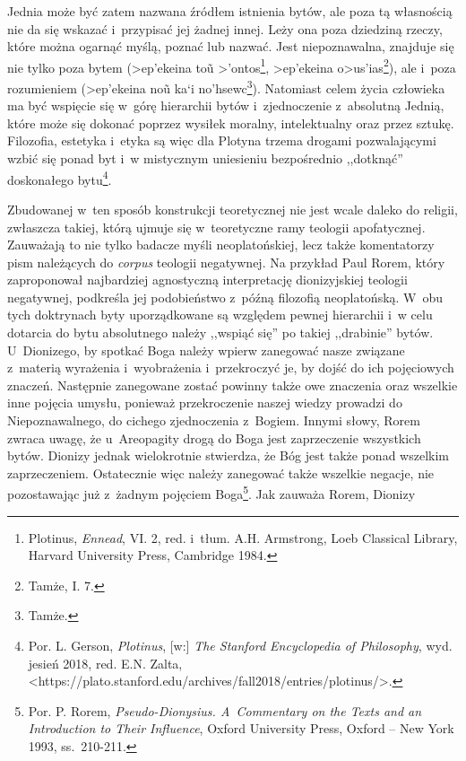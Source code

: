 Jednia może być zatem nazwana źródłem istnienia bytów, ale poza tą własnością nie da się wskazać i~przypisać jej żadnej innej. Leży ona poza dziedziną rzeczy, które można ogarnąć myślą, poznać lub nazwać. Jest niepoznawalna, znajduje się nie tylko poza bytem  (\textgreek{>ep'ekeina to\~u >'ontos}\footnote{Plotinus, \textit{Ennead}, VI. 2, red. i~tłum. A.H. Armstrong, Loeb Classical Library, Harvard University Press, Cambridge 1984.}, \textgreek{>ep'ekeina o>us'ias}\footnote{Tamże, I. 7.}), ale i~poza rozumieniem (\textgreek{>ep'ekeina no\~u  ka`i no'hsewc}\footnote{Tamże.}). Natomiast celem życia człowieka ma być wspięcie się w~górę hierarchii bytów i~zjednoczenie z~absolutną Jednią, które może się dokonać poprzez wysiłek moralny, intelektualny oraz przez sztukę. Filozofia, estetyka i~etyka są więc dla Plotyna trzema drogami pozwalającymi wzbić się ponad byt i~w mistycznym uniesieniu bezpośrednio ,,dotknąć'' doskonałego bytu\footnote{Por. L. Gerson, \textit{Plotinus}, [w:] \textit{The Stanford Encyclopedia of Philosophy}, wyd. jesień 2018, red. E.N. Zalta, {\textless}https://plato.stanford.edu/archives/fall2018/entries/plotinus/{\textgreater}.}.

Zbudowanej w~ten sposób konstrukcji teoretycznej nie jest wcale daleko do religii, zwłaszcza takiej, którą ujmuje się w~teoretyczne ramy teologii apofatycznej. Zauważają to nie tylko badacze myśli neoplatońskiej, lecz także komentatorzy pism należących do \textit{corpus} teologii negatywnej. Na przykład Paul Rorem, który zaproponował najbardziej agnostyczną interpretację dionizyjskiej teologii negatywnej, podkreśla jej podobieństwo z~późną filozofią neoplatońską. W~obu tych doktrynach byty uporządkowane są względem pewnej hierarchii i~w celu dotarcia do bytu absolutnego należy ,,wspiąć się'' po takiej ,,drabinie'' bytów. U~Dionizego, by spotkać Boga należy wpierw zanegować nasze związane z~materią wyrażenia i~wyobrażenia i~przekroczyć je, by dojść do ich pojęciowych znaczeń. Następnie zanegowane zostać powinny także owe znaczenia oraz wszelkie inne pojęcia umysłu, ponieważ przekroczenie naszej wiedzy prowadzi do Niepoznawalnego, do cichego zjednoczenia z~Bogiem. Innymi słowy, Rorem zwraca uwagę, że u~Areopagity drogą do Boga jest zaprzeczenie wszystkich bytów. Dionizy jednak wielokrotnie stwierdza, że Bóg jest także ponad wszelkim zaprzeczeniem. Ostatecznie więc należy zanegować także wszelkie negacje, nie pozostawając już z~żadnym pojęciem Boga\footnote{Por. P. Rorem, \textit{Pseudo-Dionysius. A~Commentary on the Texts and an Introduction to Their Influence}, Oxford University Press, Oxford -- New York 1993, ss.~210-211.}. Jak zauważa Rorem, Dionizy

